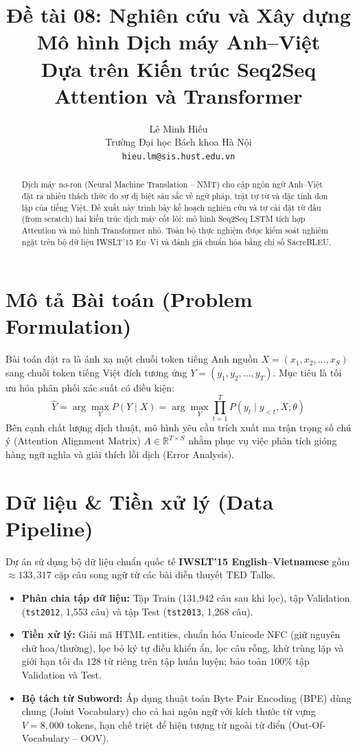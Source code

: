\documentclass[11pt]{article}
\title{Đề tài 08: Nghiên cứu và Xây dựng Mô hình Dịch máy Anh--Việt \\ Dựa trên Kiến trúc Seq2Seq Attention và Transformer}
\author{
  Lê Minh Hiếu \\
  Trường Đại học Bách khoa Hà Nội \\
  \texttt{hieu.lm@sis.hust.edu.vn}
}
\date{}
\begin{document}
\maketitle

\begin{abstract}
Dịch máy nơ-ron (Neural Machine Translation -- NMT) cho cặp ngôn ngữ Anh--Việt đặt ra nhiều thách thức do sự dị biệt sâu sắc về ngữ pháp, trật tự từ và đặc tính đơn lập của tiếng Việt. Đề xuất này trình bày kế hoạch nghiên cứu và tự cài đặt từ đầu (from scratch) hai kiến trúc dịch máy cốt lõi: mô hình Seq2Seq LSTM tích hợp Attention và mô hình Transformer nhỏ. Toàn bộ thực nghiệm được kiểm soát nghiêm ngặt trên bộ dữ liệu IWSLT'15 En--Vi và đánh giá chuẩn hóa bằng chỉ số SacreBLEU.
\end{abstract}

\section{Mô tả Bài toán (Problem Formulation)}
Bài toán đặt ra là ánh xạ một chuỗi token tiếng Anh nguồn $X = (x_1, x_2, \dots, x_S)$ sang chuỗi token tiếng Việt đích tương ứng $Y = (y_1, y_2, \dots, y_T)$.
Mục tiêu là tối ưu hóa phân phối xác suất có điều kiện:
\begin{equation}
\hat{Y} = \arg\max_{Y} P(Y \mid X) = \arg\max_{Y} \prod_{t=1}^{T} P(y_t \mid y_{<t}, X; \theta)
\end{equation}
Bên cạnh chất lượng dịch thuật, mô hình yêu cầu trích xuất ma trận trọng số chú ý (Attention Alignment Matrix) $A \in \mathbb{R}^{T \times S}$ nhằm phục vụ việc phân tích gióng hàng ngữ nghĩa và giải thích lỗi dịch (Error Analysis).

\section{Dữ liệu & Tiền xử lý (Data Pipeline)}
Dự án sử dụng bộ dữ liệu chuẩn quốc tế \textbf{IWSLT'15 English--Vietnamese} \cite{luong2015effective} gồm $\approx 133,317$ cặp câu song ngữ từ các bài diễn thuyết TED Talks.
\begin{itemize}
    \item \textbf{Phân chia tập dữ liệu:} Tập Train (131,942 câu sau khi lọc), tập Validation (\texttt{tst2012}, 1,553 câu) và tập Test (\texttt{tst2013}, 1,268 câu).
    \item \textbf{Tiền xử lý:} Giải mã HTML entities, chuẩn hóa Unicode NFC (giữ nguyên chữ hoa/thường), lọc bỏ ký tự điều khiển ẩn, lọc câu rỗng, khử trùng lặp và giới hạn tối đa $128$ từ riêng trên tập huấn luyện; bảo toàn $100\%$ tập Validation và Test.
    \item \textbf{Bộ tách từ Subword:} Áp dụng thuật toán Byte Pair Encoding (BPE) \cite{sennrich2016neural} dùng chung (Joint Vocabulary) cho cả hai ngôn ngữ với kích thước từ vựng $V = 8,000$ tokens, hạn chế triệt để hiện tượng từ ngoài từ điển (Out-Of-Vocabulary -- OOV).
\end{itemize}
\end{document}
